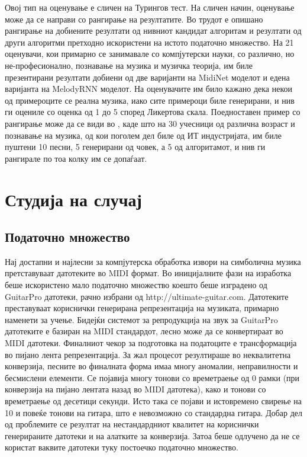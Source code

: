 Овој тип на оценување е сличен на Турингов тест. На сличен начин, оценување може да се направи со рангирање на резултатите. Во трудот \cite{Yang2017} е опишано рангирање на добиените резултати од нивниот кандидат алгоритам и резултати од други алгоритми претходно искористени на истото податочно множество. На 21 оценувачи, кои примарно се занимавале со компјутерски науки, со различно, но не-професионално, познавање на музика и музичка теорија, им биле презентирани резултати добиени од две варијанти на MidiNet моделот и едена варијанта на MelodyRNN моделот. На оценувачите им било кажано дека некои од примероците се реална музика, иако сите примероци биле генерирани, и нив ги оцениле со оценка од 1 до 5 според Ликертова скала.
Поедноставен пример со рангирање може да се види во \cite{GarciaSalas2011}, каде што на 30 учесници од различна возраст и познавање на музика, од кои поголем дел биле од ИТ индустријата, им биле пуштени 10 песни, 5 генерирани од човек, а 5 од алгоритамот, и нив ги рангирале по тоа колку им се допаѓаат.

\chapter{Студија на случај}
\label{ch:studija}

\section{Податочно множество}

Нај достапни и најлесни за компјутерска обработка извори на симболична музика претставуваат датотеките во MIDI формат. Во иницијалните фази на изработка беше искористено мало податочно множество коешто беше изградено од GuitarPro датотеки, рачно избрани од http://ultimate-guitar.com. Датотеките преставуваат кориснички генерирана репрезентација на музиката, примарно наменети за учење. Бидејќи системот за репродукција на звук за GuitarPro датотеките е базиран на MIDI стандардот, лесно може да се конвертираат во MIDI датотеки. Финалниот чекор за подготовка на податоците е трансформација во пијано лента репрезентација. За жал процесот резултираше во неквалитетна конверзија, песните во финалната форма имаа многу аномалии, неправилности и бесмислени елементи. Се појавија многу тонови со времетраење од 0 рамки (при конверзија на пијано лентата назад во MIDI датотека), како и тонови со времетраење од десетици секунди. Исто така се појави и истовремено свирење на 10 и повеќе тонови на гитара, што е невозможно со стандардна гитара. Добар дел од проблемите се резултат на нестандардниот квалитет на кориснички генерираните датотеки и на алатките за конверзија. Затоа беше одлучено да не се користат ваквите датотеки туку постоечко податочно множество.

